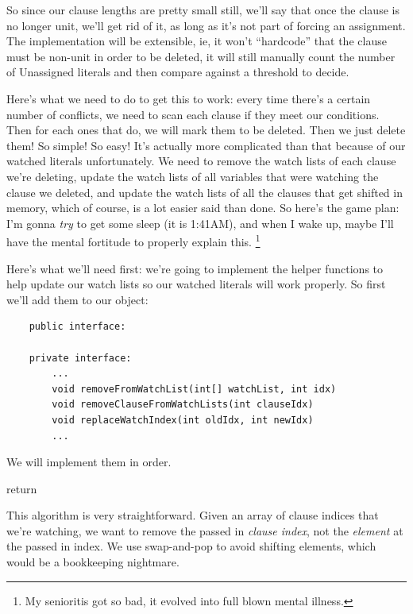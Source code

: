 So since our clause lengths are pretty small still, we'll say that once the clause 
is no longer unit, we'll get rid of it, as long as it's not part of forcing an assignment.
The implementation will be extensible, ie, it won't ``hardcode'' that the clause must be 
non-unit in order to be deleted, it will still manually count the number of Unassigned 
literals and then compare against a threshold to decide.

Here's what we need to do to get this to work: every time there's a certain number 
of conflicts, we need to scan each clause if they meet our conditions. Then for 
each ones that do, we will mark them to be deleted. Then we just delete them! So simple!
So easy! It's actually more complicated than that because of our watched literals unfortunately.
We need to remove the watch lists of each clause we're deleting, update the watch lists of all 
variables that were watching the clause we deleted, and update the watch lists of all the clauses 
that get shifted in memory, which of course, is a lot easier said than done. So here's the game 
plan: I'm gonna \textit{try} to get some sleep (it is 1:41AM), and when I wake up, maybe I'll 
have the mental fortitude to properly explain this.
\footnote{My senioritis got so bad, it evolved into full blown mental illness.}

Here's what we'll need first: we're going to implement the helper functions to help update 
our watch lists so our watched literals will work properly. So first we'll add them to our 
object:

\begin{lstlisting}
    public interface:

    private interface:
        ...
        void removeFromWatchList(int[] watchList, int idx)
        void removeClauseFromWatchLists(int clauseIdx)
        void replaceWatchIndex(int oldIdx, int newIdx)
        ...
\end{lstlisting}
\noindent
We will implement them in order.

\begin{algorithm}[H]
\caption{Remove From WatchList}\label{alg:42}
\begin{algorithmic}[1]
        \State {}
        \State {}
        \State return
    \EndIf
\EndFor

\EndProcedure
\end{algorithmic}
\end{algorithm}
This algorithm is very straightforward. Given an array of clause indices that 
we're watching, we want to remove the passed in \textit{clause index}, not 
the \textit{element} at the passed in index. We use swap-and-pop to avoid 
shifting elements, which would be a bookkeeping nightmare.

